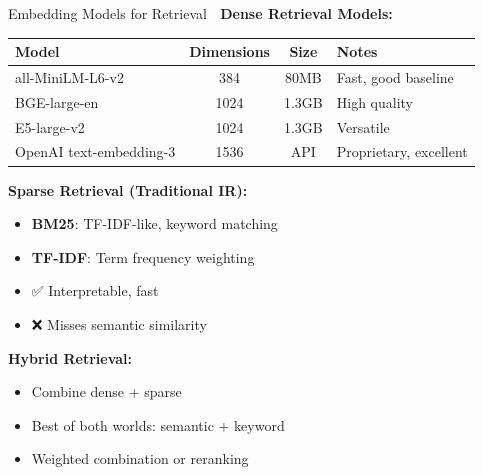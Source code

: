 \documentclass[aspectratio=169]{beamer}
\begin{document}
\begin{frame}[shrink=10]{Embedding Models for Retrieval 🎯}
\textbf{Dense Retrieval Models:}

\vspace{0.5em}

\begin{table}
\small
\begin{tabular}{l c c l}
\toprule
\textbf{Model} & \textbf{Dimensions} & \textbf{Size} & \textbf{Notes} \\
\midrule
all-MiniLM-L6-v2 & 384 & 80MB & Fast, good baseline \\
BGE-large-en & 1024 & 1.3GB & High quality \\
E5-large-v2 & 1024 & 1.3GB & Versatile \\
OpenAI text-embedding-3 & 1536 & API & Proprietary, excellent \\
\bottomrule
\end{tabular}
\end{table}

\vspace{0.5em}

\textbf{Sparse Retrieval (Traditional IR):}
\begin{itemize}\setlength{\itemsep}{0pt}
    \item \textbf{BM25}: TF-IDF-like, keyword matching
    \item \textbf{TF-IDF}: Term frequency weighting
    \item ✅ Interpretable, fast
    \item ❌ Misses semantic similarity
\end{itemize}

\vspace{0.5em}

\textbf{Hybrid Retrieval:}
\begin{itemize}\setlength{\itemsep}{0pt}
    \item Combine dense + sparse
    \item Best of both worlds: semantic + keyword
    \item Weighted combination or reranking
\end{itemize}
\end{frame}
\end{document}
